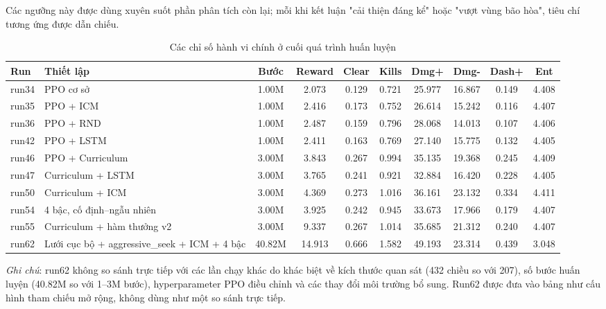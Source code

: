 Các ngưỡng này được dùng xuyên suốt phần phân tích còn lại; mỗi khi kết luận "cải thiện đáng kể" hoặc "vượt vùng bão hòa", tiêu chí tương ứng được dẫn chiếu.

\begin{table}[H]
    \centering
    \scriptsize
    \setlength{\tabcolsep}{4pt}
    \renewcommand{\arraystretch}{1.15}
    \caption{Các chỉ số hành vi chính ở cuối quá trình huấn luyện}
    \label{tab:run_metrics_main}
    \begin{tabular}{l p{3.0cm} c c c c c c c c}
        \toprule
        \textbf{Run} & \textbf{Thiết lập} & \textbf{Bước} & \textbf{Reward} & \textbf{Clear} & \textbf{Kills} & \textbf{Dmg+} & \textbf{Dmg-} & \textbf{Dash+} & \textbf{Ent} \\
        \midrule
        run34 & PPO cơ sở & 1.00M & 2.073 & 0.129 & 0.721 & 25.977 & 16.867 & 0.149 & 4.408 \\
        run35 & PPO + ICM & 1.00M & 2.416 & 0.173 & 0.752 & 26.614 & 15.242 & 0.116 & 4.407 \\
        run36 & PPO + RND & 1.00M & 2.487 & 0.159 & 0.796 & 28.068 & 14.013 & 0.107 & 4.406 \\
        run42 & PPO + LSTM & 1.00M & 2.411 & 0.163 & 0.769 & 27.140 & 15.775 & 0.132 & 4.405 \\
        run46 & PPO + Curriculum & 3.00M & 3.843 & 0.267 & 0.994 & 35.135 & 19.368 & 0.245 & 4.409 \\
        run47 & Curriculum + LSTM & 3.00M & 3.765 & 0.241 & 0.921 & 32.884 & 16.420 & 0.228 & 4.405 \\
        run50 & Curriculum + ICM & 3.00M & 4.369 & 0.273 & 1.016 & 36.161 & 23.132 & 0.334 & 4.411 \\
        run54 & 4 bậc, cố định--ngẫu nhiên & 3.00M & 3.925 & 0.242 & 0.945 & 33.673 & 17.966 & 0.179 & 4.407 \\
        run55 & Curriculum + hàm thưởng v2 & 3.00M & 9.337 & 0.267 & 1.014 & 35.685 & 21.312 & 0.240 & 4.407 \\
        run62 & Lưới cục bộ + aggressive\_seek + ICM + 4 bậc & 40.82M & 14.913 & 0.666 & 1.582 & 49.193 & 23.314 & 0.439 & 3.048 \\
        \bottomrule
    \end{tabular}
    
    \begin{minipage}{0.96\textwidth}
        \small\textit{Ghi chú}: run62 không so sánh trực tiếp với các lần chạy khác do khác biệt về kích thước quan sát (432 chiều so với 207), số bước huấn luyện (40.82M so với 1--3M bước), hyperparameter PPO điều chỉnh và các thay đổi môi trường bổ sung. Run62 được đưa vào bảng như cấu hình tham chiếu mở rộng, không dùng như một so sánh trực tiếp.
    \end{minipage}
\end{table}

